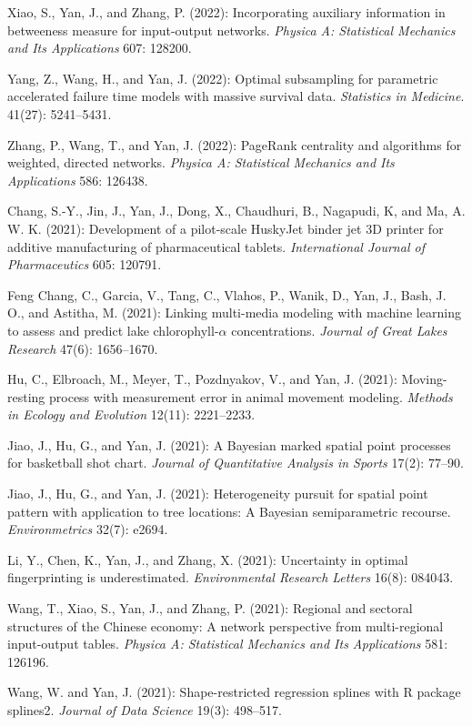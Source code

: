 \documentclass[Statistics]{vita}
\begin{document}
\begin{vita}
\begin{Publications}
\begin{RefereedJournalArticles}
  \item *Xiao, S., Yan, J., and Zhang, P. (2022): Incorporating auxiliary information in betweeness measure for input-output networks. {\em Physica A: Statistical Mechanics and Its Applications\/} 607: 128200.
  \item *Yang, Z., Wang, H., and Yan, J. (2022): Optimal subsampling for parametric accelerated failure time models with massive survival data. {\em Statistics in Medicine}. 41(27): 5241--5431.
  \item Zhang, P., Wang, T., and Yan, J. (2022): PageRank centrality and algorithms for weighted, directed networks. {\em Physica A: Statistical Mechanics and Its Applications\/} 586: 126438.
  \item Chang, S.-Y., Jin, J., Yan, J., Dong, X., Chaudhuri, B., Nagapudi, K, and Ma, A. W. K. (2021): Development of a pilot-scale HuskyJet binder jet 3D printer for additive manufacturing of pharmaceutical tablets. {\em International Journal of Pharmaceutics\/} 605: 120791.
  \item Feng Chang, C., Garcia, V., Tang, C., Vlahos, P., Wanik, D., Yan, J., Bash, J. O., and Astitha, M. (2021): Linking multi-media modeling with machine learning to assess and predict lake chlorophyll-$\alpha$ concentrations. {\em Journal of Great Lakes Research\/} 47(6): 1656--1670.
  \item *Hu, C., Elbroach, M., Meyer, T., Pozdnyakov, V., and Yan, J. (2021): Moving-resting process with measurement error in animal movement modeling. {\em Methods in Ecology and Evolution\/} 12(11): 2221--2233.
  \item *Jiao, J., Hu, G., and Yan, J. (2021): A Bayesian marked spatial point processes for basketball shot chart. {\em Journal of Quantitative Analysis in Sports\/} 17(2): 77--90. 
  \item *Jiao, J., Hu, G., and Yan, J. (2021): Heterogeneity pursuit for spatial point pattern with application to tree locations: A Bayesian semiparametric recourse. {\em Environmetrics\/} 32(7): e2694.
  \item *Li, Y., Chen, K., Yan, J., and Zhang, X. (2021): Uncertainty in optimal fingerprinting is underestimated. {\em Environmental Research Letters\/} 16(8): 084043.
  \item *Wang, T., Xiao, S., Yan, J., and Zhang, P. (2021): Regional and sectoral structures of the Chinese economy: A network perspective from multi-regional input-output tables. {\em Physica A: Statistical Mechanics and Its Applications\/} 581: 126196.
  \item *Wang, W. and Yan, J. (2021): Shape-restricted regression splines with R package splines2. {\em Journal of Data Science\/} 19(3): 498--517.

\end{RefereedJournalArticles}
\end{Publications}
\end{vita}
\end{document}
